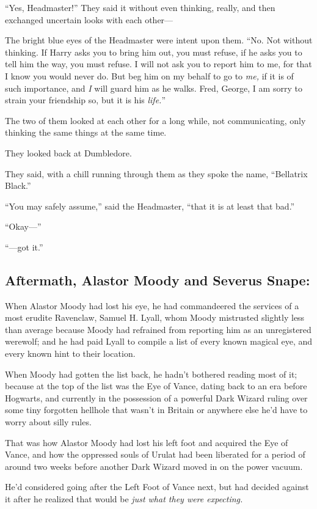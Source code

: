 “Yes, Headmaster!” They said it without even thinking, really, and then exchanged uncertain looks with each other—

The bright blue eyes of the Headmaster were intent upon them. “No. Not without thinking. If Harry asks you to bring him out, you must refuse, if he asks you to tell him the way, you must refuse. I will not ask you to report him to me, for that I know you would never do. But beg him on my behalf to go to \emph{me,} if it is of such importance, and \emph{I} will guard him as he walks. Fred, George, I am sorry to strain your friendship so, but it is his \emph{life.}”

The two of them looked at each other for a long while, not communicating, only thinking the same things at the same time.

They looked back at Dumbledore.

They said, with a chill running through them as they spoke the name, “Bellatrix Black.”

“You may safely assume,” said the Headmaster, “that it is at least that bad.”

“Okay—”

“—got it.”
\replacement{\sbreak}{}

\subsection{Aftermath, Alastor Moody and Severus Snape:}

\noindent{}When Alastor Moody had lost his eye, he had commandeered the services of a most erudite Ravenclaw, Samuel H. Lyall, whom Moody mistrusted slightly less than average because Moody had refrained from reporting him as an unregistered werewolf; and he had paid Lyall to compile a list of every known magical eye, and every known hint to their location.

When Moody had gotten the list back, he hadn’t bothered reading most of it; because at the top of the list was the Eye of Vance, dating back to an era before Hogwarts, and currently in the possession of a powerful Dark Wizard ruling over some tiny forgotten hellhole that wasn’t in Britain or anywhere else he’d have to worry about silly rules.

That was how Alastor Moody had lost his left foot and acquired the Eye of Vance, and how the oppressed souls of Urulat had been liberated for a period of around two weeks before another Dark Wizard moved in on the power vacuum.

He’d considered going after the Left Foot of Vance next, but had decided against it after he realized that would be \emph{just what they were expecting.}

